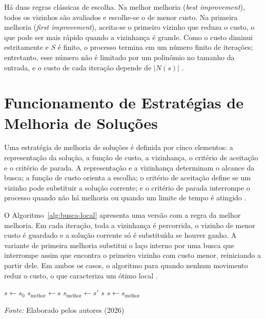 Há duas regras clássicas de escolha. Na melhor melhoria (\textit{best improvement}), todos os vizinhos são avaliados e escolhe-se o de menor custo. Na primeira melhoria (\textit{first improvement}), aceita-se o primeiro vizinho que reduza o custo, o que pode ser mais rápido quando a vizinhança é grande. Como o custo diminui estritamente e $S$ é finito, o processo termina em um número finito de iterações; entretanto, esse número não é limitado por um polinômio no tamanho da entrada, e o custo de cada iteração depende de $|N(s)|$ \cite{papadimitriou1977, englert2014}.

\section{Funcionamento de Estratégias de Melhoria de Soluções}

Uma estratégia de melhoria de soluções é definida por cinco elementos: a representação da solução, a função de custo, a vizinhança, o critério de aceitação e o critério de parada. A representação e a vizinhança determinam o alcance da busca; a função de custo orienta a escolha; o critério de aceitação define se um vizinho pode substituir a solução corrente; e o critério de parada interrompe o processo quando não há melhoria ou quando um limite de tempo é atingido \cite{goldbarg2005, souza_ufop}.

O Algoritmo~\ref{alg:busca-local} apresenta uma versão com a regra da melhor melhoria. Em cada iteração, toda a vizinhança é percorrida, o vizinho de menor custo é guardado e a solução corrente só é substituída se houver ganho. A variante de primeira melhoria substitui o laço interno por uma busca que interrompe assim que encontra o primeiro vizinho com custo menor, reiniciando a partir dele. Em ambos os casos, o algoritmo para quando nenhum movimento reduz o custo, o que caracteriza um ótimo local \cite{aarts2003}.

\begin{algorithm}[ht]
\caption{Busca local com regra da melhor melhoria.}
\label{alg:busca-local}
\begin{algorithmic}[1]
\STATE $s \gets s_0$
    \STATE $s_{\text{melhor}} \gets s$
            \STATE $s_{\text{melhor}} \gets s'$
        \ENDIF
    \ENDFOR
        \RETURN $s$
    \ENDIF
    \STATE $s \gets s_{\text{melhor}}$
\ENDWHILE
\end{algorithmic}
\footnotesize{\textit{Fonte:} Elaborado pelos autores (2026)}
\end{algorithm}

